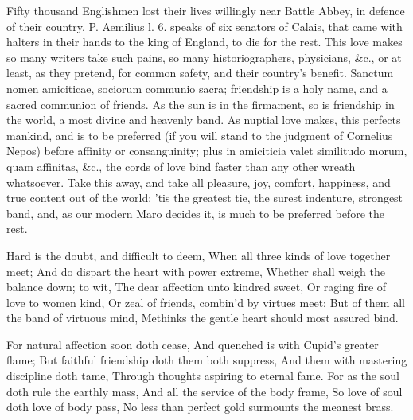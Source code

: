 {Fifty thousand Englishmen lost their lives willingly near Battle Abbey,
in defence of their country. P. Aemilius l. 6. speaks of six
senators of Calais, that came with halters in their hands to the king
of England, to die for the rest. This love makes so many writers take
such pains, so many historiographers, physicians, \&c., or at least, as
they pretend, for common safety, and their country's benefit.
Sanctum nomen amiciticae, sociorum communio sacra; friendship is
a holy name, and a sacred communion of friends. As the sun is in
the firmament, so is friendship in the world, a most divine and
heavenly band. As nuptial love makes, this perfects mankind, and is to
be preferred (if you will stand to the judgment of Cornelius
Nepos) before affinity or consanguinity; plus in amiciticia valet
similitudo morum, quam affinitas, \&c., the cords of love bind faster
than any other wreath whatsoever. Take this away, and take all
pleasure, joy, comfort, happiness, and true content out of the world;
'tis the greatest tie, the surest indenture, strongest band, and, as
our modern Maro decides it, is much to be preferred before the rest.

Hard is the doubt, and difficult to deem,
When all three kinds of love together meet;
And do dispart the heart with power extreme,
Whether shall weigh the balance down; to wit,
The dear affection unto kindred sweet,
Or raging fire of love to women kind,
Or zeal of friends, combin'd by virtues meet;
But of them all the band of virtuous mind,
Methinks the gentle heart should most assured bind.

For natural affection soon doth cease,
And quenched is with Cupid's greater flame;
But faithful friendship doth them both suppress,
And them with mastering discipline doth tame,
Through thoughts aspiring to eternal fame.
For as the soul doth rule the earthly mass,
And all the service of the body frame,
So love of soul doth love of body pass,
No less than perfect gold surmounts the meanest brass.

}
